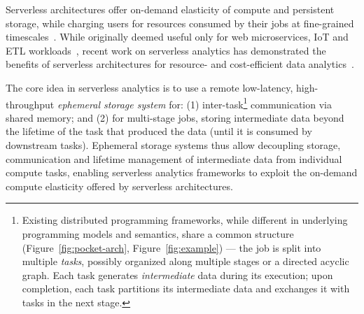 Serverless architectures offer on-demand elasticity of compute and persistent storage, while charging users for resources consumed by their jobs at fine-grained timescales~\cite{alambda, azureFunctions, googlefunctions}. While originally deemed useful only for web microservices, IoT and ETL workloads~\cite{serverlesssurvey, serverlesssurvey2}, recent work on serverless analytics has demonstrated the benefits of serverless architectures for resource- and cost-efficient data analytics~\cite{starling, locus, pocket, flint, sparkonlambda, cirrus, excamera, pywren, numpywren, gg, athena, aurora, azuresqldw, cloudburst, snowset, caerus}. 

The core idea in serverless analytics is to use a remote low-latency, high-throughput {\em ephemeral storage system} for: (1) inter-task{\footnote{Existing distributed programming frameworks, while different in underlying programming models and semantics, share a common structure (Figure~\ref{fig:pocket-arch}, Figure~\ref{fig:example}) --- the job is split into multiple {\em tasks}, possibly organized along multiple stages or a directed acyclic graph. Each task generates {\em intermediate} data during its execution; upon completion, each task partitions its intermediate data and exchanges it with tasks in the next stage.}} communication via shared memory; and (2) for multi-stage jobs, storing intermediate data beyond the lifetime of the task that produced the data (until it is consumed by downstream tasks). Ephemeral storage systems thus allow decoupling storage, communication and lifetime management of intermediate data from individual compute tasks, enabling serverless analytics frameworks to exploit the on-demand compute elasticity offered by serverless architectures. 

